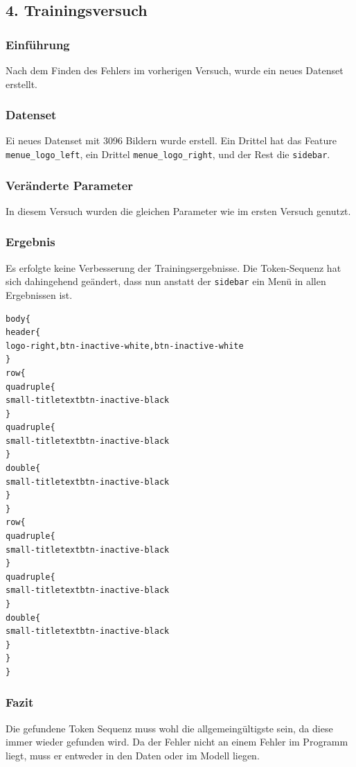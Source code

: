 \documentclass[pdftex,a4paper,halfparskip, article]{scrartcl}
\begin{document}
\subsection{4. Trainingsversuch}


\subsubsection*{Einführung}

Nach dem Finden des Fehlers im vorherigen Versuch, wurde ein neues Datenset erstellt.

\subsubsection*{Datenset}

Ei neues Datenset mit 3096 Bildern wurde erstell. Ein Drittel hat das Feature \texttt{menue\_logo\_left}, ein Drittel \texttt{menue\_logo\_right}, und der Rest die \texttt{sidebar}. 

\subsubsection*{Veränderte Parameter}

In diesem Versuch wurden die gleichen Parameter wie im ersten Versuch genutzt.

\subsubsection*{Ergebnis}

Es erfolgte keine Verbesserung der Trainingsergebnisse. Die Token-Sequenz hat sich dahingehend geändert, dass nun anstatt der \texttt{sidebar} ein Menü in allen Ergebnissen ist.

\begin{verbatim}
body{
header{
logo-right,btn-inactive-white,btn-inactive-white
}
row{
quadruple{
small-titletextbtn-inactive-black
}
quadruple{
small-titletextbtn-inactive-black
}
double{
small-titletextbtn-inactive-black
}
}
row{
quadruple{
small-titletextbtn-inactive-black
}
quadruple{
small-titletextbtn-inactive-black
}
double{
small-titletextbtn-inactive-black
}
}
}
\end{verbatim}

\subsubsection*{Fazit}

Die gefundene Token Sequenz muss wohl die allgemeingültigste sein, da diese immer wieder gefunden wird. Da der Fehler nicht an einem Fehler im Programm liegt, muss er entweder in den Daten oder im Modell liegen. 
\end{document}
